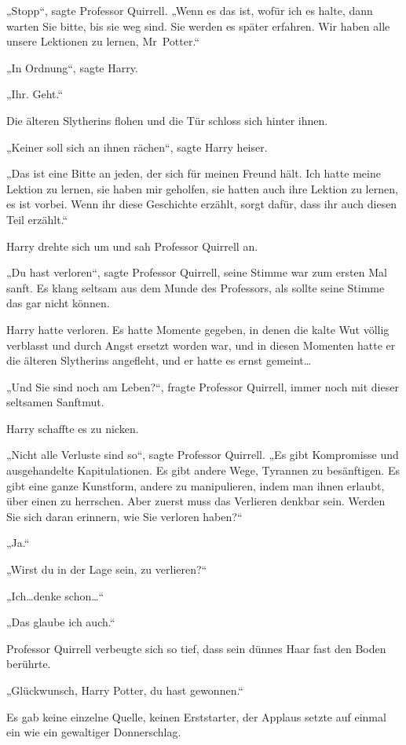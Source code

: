{„Stopp“, sagte Professor Quirrell. „Wenn es das ist, wofür ich es halte, dann warten Sie bitte, bis sie weg sind. Sie werden es später erfahren. Wir haben alle unsere Lektionen zu lernen, Mr~Potter.“

„In Ordnung“, sagte Harry.

„Ihr. Geht.“

Die älteren Slytherins flohen und die Tür schloss sich hinter ihnen.

„Keiner soll sich an ihnen rächen“, sagte Harry heiser.

„Das ist eine Bitte an jeden, der sich für meinen Freund hält. Ich hatte meine Lektion zu lernen, sie haben mir geholfen, sie hatten auch ihre Lektion zu lernen, es ist vorbei. Wenn ihr diese Geschichte erzählt, sorgt dafür, dass ihr auch diesen Teil erzählt.“

Harry drehte sich um und sah Professor Quirrell an.

„Du hast verloren“, sagte Professor Quirrell, seine Stimme war zum ersten Mal sanft. Es klang seltsam aus dem Munde des Professors, als sollte seine Stimme das gar nicht können.

Harry hatte verloren. Es hatte Momente gegeben, in denen die kalte Wut völlig verblasst und durch Angst ersetzt worden war, und in diesen Momenten hatte er die älteren Slytherins angefleht, und er hatte es ernst gemeint…

„Und Sie sind noch am Leben?“, fragte Professor Quirrell, immer noch mit dieser seltsamen Sanftmut.

Harry schaffte es zu nicken.

„Nicht alle Verluste sind so“, sagte Professor Quirrell. „Es gibt Kompromisse und ausgehandelte Kapitulationen. Es gibt andere Wege, Tyrannen zu besänftigen. Es gibt eine ganze Kunstform, andere zu manipulieren, indem man ihnen erlaubt, über einen zu herrschen. Aber zuerst muss das Verlieren denkbar sein. Werden Sie sich daran erinnern, wie Sie verloren haben?“

„Ja.“

„Wirst du in der Lage sein, zu verlieren?“

„Ich…denke schon…“

„Das glaube ich auch.“

Professor Quirrell verbeugte sich so tief, dass sein dünnes Haar fast den Boden berührte.

„Glückwunsch, Harry Potter, du hast gewonnen.“

Es gab keine einzelne Quelle, keinen Erststarter, der Applaus setzte auf einmal ein wie ein gewaltiger Donnerschlag.

}
